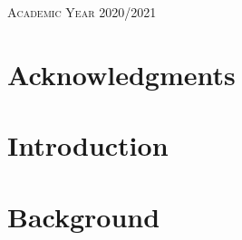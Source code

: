 \documentclass[a4paper,12pt,twoside]{report}
\begin{document}
\begin{onehalfspace}
\begin{titlepage}
\begin{center}
\textsc{Academic Year 2020/2021}\\[0.25cm] %

\vfill

\end{center}
\end{titlepage}

\clearpage
	\fancyhf{}
	\rhead{\thepage}
\chapter*{Acknowledgments}
\label{c:ack}





\clearpage
	\fancyhf{}
	\rhead{\thepage}
	\lhead{\textbf{ \nouppercase{\leftmark}} }
\tableofcontents

\clearpage
{}
\listoffigures

\clearpage
{}
\listoftables

%


\clearpage
	\fancyhf{}
	\rhead{\thepage}
	\lhead{\nouppercase{\leftmark}}
\chapter{Introduction}
\label{c:intro}



%

\clearpage
\chapter{Background}
\label{c:background}



\end{onehalfspace}
\end{document}
